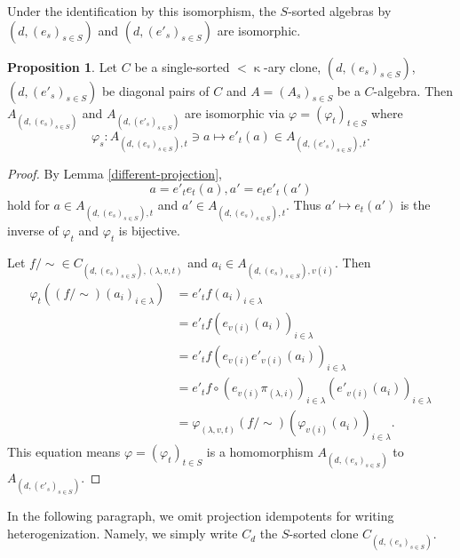 \documentclass[a4paper,10pt]{article}
\theoremstyle{definition}
\newtheorem{prop}[df]{Proposition}
\newcommand\ph{\varphi}
\newcommand\mc{\mathclose}
\begin{document}
Under the identification by this isomorphism, the $S$-sorted algebras 
by $(d,(e_s)_{s\in S})$ and $(d,(e'_s)_{s\in S})$ are isomorphic.
\begin{prop}
Let $C$ be a single-sorted $<\mc\kappa$-ary clone, ${(d,(e_s)_{s\in S})}$, ${(d,(e'_s)_{s\in S})}$
be diagonal pairs of $C$ and \mbox{$A=(A_s)_{s\in S}$} be a $C$-algebra.
Then $A_{(d,(e_s)_{s\in S})}$ and $A_{(d,(e'_s)_{s\in S})}$ are isomorphic via
$\ph=(\ph_t)_{t\in S}$ where
\[
\ph_s:A_{(d,(e_s)_{s\in S}),t}\ni a\mapsto e'_t(a)\in A_{(d,(e'_s)_{s\in S}),t}.
\]
\end{prop}
\begin{proof}
By Lemma \ref{different-projection},
\[
a=e'_te_t(a), a'=e_te'_t(a')
\]
hold for $a\in A_{(d,(e_s)_{s\in S}),t}$ and $a'\in A_{(d,(e_s)_{s\in S}),t}$.
Thus $a'\mapsto e_t(a')$ is the inverse of $\ph_t$ and $\ph_t$ is bijective.

Let $f/\mc\sim\in C_{(d,(e_s)_{s\in S}),(\lambda,v,t)}$ and $a_i\in A_{(d,(e_s)_{s\in S}),v(i)}$.
Then
\begin{align*}
\ph_t((f/\mc\sim)(a_i)_{i\in \lambda})
&=e'_tf(a_i)_{i\in\lambda}\\
&=e'_tf(e_{v(i)}(a_i))_{i\in\lambda}\\
&=e'_tf(e_{v(i)}e'_{v(i)}(a_i))_{i\in\lambda}\\
&=e'_tf\circ(e_{v(i)}\pi_{(\lambda,i)})_{i\in\lambda}(e'_{v(i)}(a_i))_{i\in\lambda}\\
&=\ph_{(\lambda,v,t)}(f/\mc\sim)(\ph_{v(i)}(a_i))_{i\in\lambda}.
\end{align*}
This equation means $\ph=(\ph_t)_{t\in S}$ is a homomorphism
$A_{(d,(e_s)_{s\in S})}$ to $A_{(d,(e'_s)_{s\in S})}$.
\end{proof}




In the following paragraph, we omit projection idempotents for writing heterogenization.
Namely, we simply write $C_{d}$ the $S$-sorted clone $C_{(d,(e_s)_{s\in S})}$.
\end{document}
